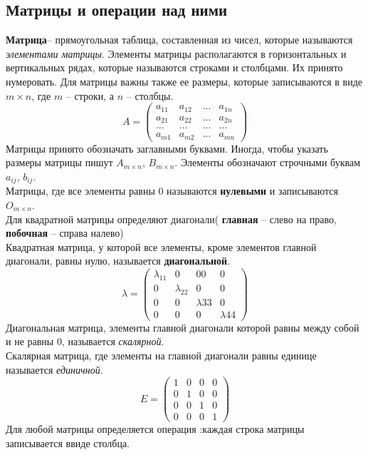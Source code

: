 \documentclass[oneside]{book}
\begin{document}
\begin{enumerate}
\begin{itemize}
\begin{enumerate}
\chapter{Матрицы и операции над ними\\}
\textbf{Матрица}-- прямоугольная таблица, составленная из чисел, которые называются \textit{элементами матрицы}. Элементы матрицы располагаются в горизонтальных и вертикальных рядах, которые называются строками и столбцами. Их принято нумеровать. Для матрицы важны также ее размеры, которые записываются в виде $m\times n$, где $m$ -- строки, а $n$ -- столбцы.
$$A=\begin{pmatrix} a_{1 1} & a_{1 2} & ... & a_{1 n}\\
a_{2 1} & a_{2 2} & ... & a_{2 n}\\ 
... & ... & ... & ...\\
a_{m 1} & a_{m 2} & ... & a_{m n}\end{pmatrix}$$
Матрицы принято обозначать заглавными буквами. Иногда, чтобы указать размеры матрицы пишут $A_{m\times n}$, $B_{m\times n}$. Элементы обозначают строчными буквам $a_{i j}$, $b_{i j}$.\\
Матрицы, где все элементы равны 0 называются \textbf{нулевыми} и записываются $O_{m\times n}$.\\
Для квадратной матрицы определяют диагонали( \textbf{главная} -- слево на право, \textbf{побочная} -- справа налево)\\
Квадратная матрица, у которой все элементы, кроме элементов
главной диагонали, равны нулю, называется \textbf{диагональной}.
$$ \lambda=\begin{pmatrix} \lambda_{1 1} & 0 & 00 & 0\\
0 & \lambda_{2 2} & 0 & 0\\ 
0 & 0 & \lambda{3 3} & 0\\
0 & 0 & 0& \lambda{4 4}\end{pmatrix}$$
Диагональная матрица, элементы главной диагонали которой равны между собой и не равны 0, называется \textit{скалярной}.\\
Скалярная матрица, где элементы на главной диагонали равны единице называется \textit{единичной}.
$$ E =\begin{pmatrix} 1 & 0 & 0 & 0\\
0 & 1 & 0 & 0\\ 
0 & 0 & 1 & 0\\
0 & 0 & 0 & 1\end{pmatrix}$$
Для любой матрицы определяется операция :каждая строка матрицы записывается ввиде столбца.

\end{enumerate}
\end{itemize}
\end{enumerate}
\end{document}
